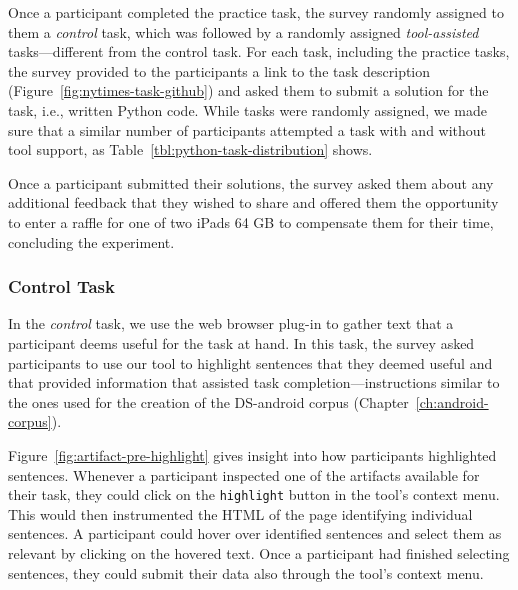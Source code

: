 Once a participant completed the practice task, the survey randomly assigned to them a \textit{control} task, which was followed by a randomly assigned \textit{tool-assisted} tasks---different from the control task.
For each task, including the practice tasks, the survey provided to the participants a link 
to the task description (Figure~\ref{fig:nytimes-task-github}) and asked them to submit a solution for the task, i.e., written Python code. While tasks were randomly assigned, we made sure that a similar number of participants attempted a task with and without tool support, as Table~\ref{tbl:python-task-distribution} shows.


Once a participant submitted their solutions, the survey
asked them about any additional feedback that they wished to share and 
offered them the opportunity to enter a raffle for one of two iPads 64 GB 
to compensate them for their time, concluding the experiment.







\subsubsection{Control Task}
\label{cp6:procedures-manual}


In the \textit{control} task, we use the web browser plug-in to gather text that a participant deems useful for the task at hand. In this task, 
the survey asked participants to use our tool to highlight sentences that they deemed useful and that provided information that assisted task completion---instructions similar to the ones used for the creation of the \acs{DS-android} corpus (Chapter~\ref{ch:android-corpus}). 




Figure~\ref{fig:artifact-pre-highlight}
gives insight into how participants highlighted sentences. 
Whenever a participant inspected one of the artifacts available for their task, 
they could click on the \texttt{highlight} button in the tool's context menu.  
This would then instrumented the HTML of the page identifying individual sentences. 
A participant could hover over identified sentences and select them as relevant by clicking on the hovered text.
Once a participant had finished selecting sentences, they could submit 
their data also through the tool's context menu.

